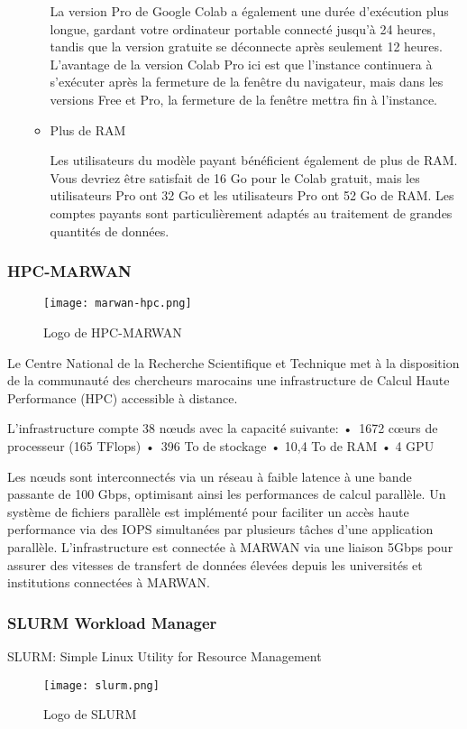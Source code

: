 \begin{enumerate}
\begin{itemize}[label=$\bullet$]
            La version Pro de Google Colab a également une durée d'exécution plus longue, gardant votre ordinateur portable connecté jusqu'à 24 heures, tandis que la version gratuite se déconnecte après seulement 12 heures. 
            L'avantage de la version Colab Pro ici est que l'instance continuera à s'exécuter  après la fermeture de la fenêtre du navigateur, mais dans les versions Free et Pro, la fermeture de la fenêtre mettra fin à l'instance. 
            \item Plus de RAM
            
            Les utilisateurs du modèle payant bénéficient également de plus de RAM. Vous devriez être satisfait de 16 Go pour le Colab gratuit, mais les utilisateurs Pro ont 32 Go et les utilisateurs Pro ont  52 Go de RAM. Les comptes payants sont particulièrement adaptés au traitement de grandes quantités de données.
        \end{itemize}
        
       
        \bfseries
    \end{enumerate}
    \subsubsection{HPC-MARWAN}
    \begin{figure}[H]
        \centering
        \texttt{[image: marwan-hpc.png]}
        \caption{Logo de HPC-MARWAN}\label{fig:marwan-hpc}
    \end{figure}
    Le Centre National de la Recherche Scientifique et Technique met à la disposition de la communauté des chercheurs marocains une infrastructure de Calcul Haute Performance (HPC) accessible à distance.

    L'infrastructure compte 38 nœuds avec la capacité suivante:
    • 1672 cœurs de processeur (165 TFlops)
    • 396 To de stockage
    • 10,4 To de RAM
    • 4 GPU

    Les nœuds sont interconnectés via un réseau à faible latence à une bande passante de 100 Gbps, optimisant ainsi les performances de calcul parallèle. Un système de fichiers parallèle est implémenté pour faciliter un accès haute performance via des IOPS simultanées par plusieurs tâches d'une application parallèle.
    L'infrastructure est connectée à MARWAN via une liaison 5Gbps pour assurer des vitesses de transfert de données élevées depuis les universités et institutions connectées à MARWAN.

    \subsubsection*{SLURM Workload Manager}
    SLURM: Simple Linux Utility for Resource Management
    \begin{figure}[H]
        \centering
        \texttt{[image: slurm.png]}
        \caption{Logo de SLURM}\label{fig:slurm}
    \end{figure}

